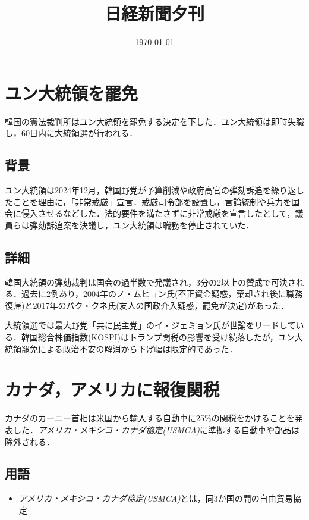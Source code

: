 \documentclass{ltjsarticle}
\title{日経新聞夕刊}
\author{}
\date{\today}
\begin{document}
\maketitle

\section{ユン大統領を罷免}

韓国の憲法裁判所はユン大統領を罷免する決定を下した．ユン大統領は即時失職し，60日内に大統領選が行われる．


\subsection{背景}

ユン大統領は2024年12月，韓国野党が予算削減や政府高官の弾劾訴追を繰り返したことを理由に，「非常戒厳」宣言．戒厳司令部を設置し，言論統制や兵力を国会に侵入させるなどした．法的要件を満たさずに非常戒厳を宣言したとして，議員らは弾劾訴追案を決議し，ユン大統領は職務を停止されていた．

\subsection{詳細}

韓国大統領の弾劾裁判は国会の過半数で発議され，3分の2以上の賛成で可決される．過去に2例あり，2004年のノ・ムヒョン氏(不正資金疑惑，棄却され後に職務復帰)と2017年のパク・クネ氏(友人の国政介入疑惑，罷免が決定)があった．

大統領選では最大野党「共に民主党」のイ・ジェミョン氏が世論をリードしている．韓国総合株価指数(KOSPI)はトランプ関税の影響を受け続落したが，ユン大統領罷免による政治不安の解消から下げ幅は限定的であった．





\section{カナダ，アメリカに報復関税}

カナダのカーニー首相は米国から輸入する自動車に25\%の関税をかけることを発表した．\emph{アメリカ・メキシコ・カナダ協定(USMCA)}に準拠する自動車や部品は除外される．

\subsection{用語}

\begin{itemize}
  \item \emph{アメリカ・メキシコ・カナダ協定(USMCA)}とは，同3か国の間の自由貿易協定
\end{itemize}
\end{document}
